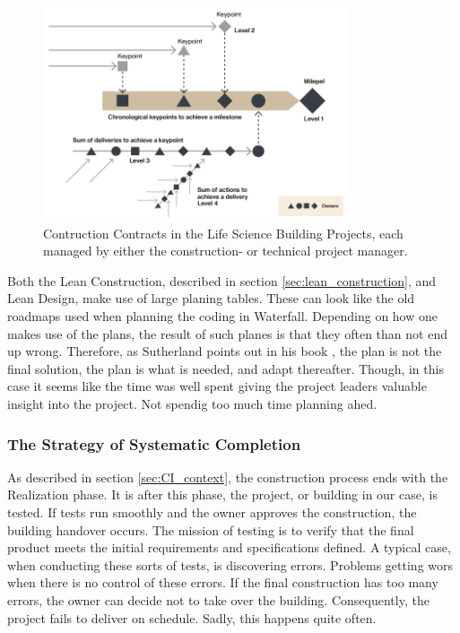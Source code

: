 \begin{figure}
    \centering
    \includegraphics[width=0.8\textwidth]{fig/LSB_task_levels.png}
    \caption{Contruction Contracts in the Life Science Building Projects, each managed by either the construction- or technical project manager.}
    \label{fig:Milestones-Keypoints-Deliveries-Actions}
\end{figure}

Both the Lean Construction, described in section \ref{sec:lean_construction}, and Lean Design, make use of large planing tables. These can look like the old roadmaps used when planning the coding in Waterfall. Depending on how one makes use of the plans, the result of such planes is that they often than not end up wrong. Therefore, as Sutherland points out in his book \citep{sutherland}, the plan is not the final solution, the plan is what is needed, and adapt thereafter. Though, in this case it seems like the time was well spent giving the project leaders valuable insight into the project. Not spendig too much time planning ahed. 

\subsubsection*{The Strategy of Systematic Completion}
As described in section \ref{sec:CI_context}, the construction process ends with the Realization phase. It is after this phase, the project, or building in our case, is tested. If tests run smoothly and the owner approves the construction, the building handover occurs. The mission of testing is to verify that the final product meets the initial requirements and specifications defined. A typical case, when conducting these sorts of tests, is discovering errors. Problems getting wors when there is no control of these errors. If the final construction has too many errors, the owner can decide not to take over the building. Consequently, the project fails to deliver on schedule. Sadly, this happens quite often.

